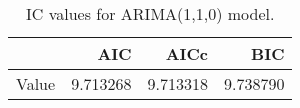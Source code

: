 \begin{table}[ht]
\centering
\begin{tabular}{rrrr}
  \hline
 & AIC & AICc & BIC \\ 
  \hline
Value & 9.713268 & 9.713318 & 9.738790 \\ 
   \hline
\end{tabular}
\caption{IC values for ARIMA(1,1,0) model.}
\end{table}